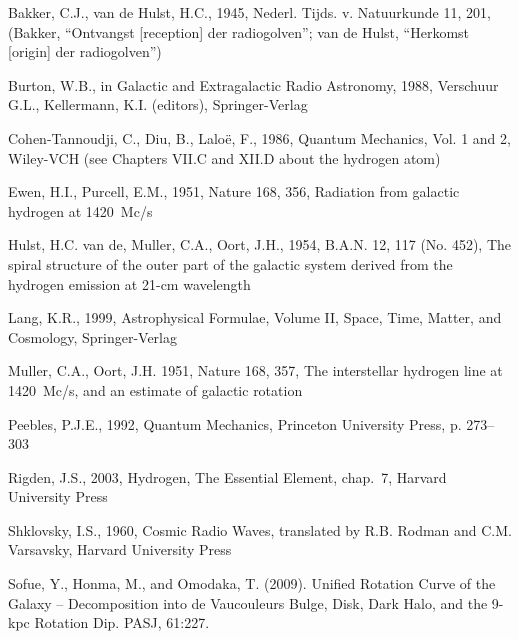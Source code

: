 \begin{thebibliography}{99}

 Bakker, C.J., van de Hulst, H.C., 1945, Nederl. Tijds. v. Natuurkunde
11, 201, (Bakker, ``Ontvangst [reception] der radiogolven'';
van de Hulst, ``Herkomst [origin] der radiogolven'')

 Burton, W.B., in Galactic and Extragalactic Radio Astronomy, 1988,
Verschuur G.L., Kellermann, K.I. (editors), Springer-Verlag

 Cohen-Tannoudji, C., Diu, B., Lalo\"e, F., 1986,
Quantum Mechanics, Vol. 1 and 2, Wiley-VCH (see Chapters VII.C and
XII.D about the hydrogen atom)

 Ewen, H.I., Purcell, E.M., 1951, Nature 168, 356,
Radiation from galactic hydrogen at 1420~Mc/s

 Hulst, H.C. van de, Muller, C.A., Oort, J.H., 1954,
B.A.N. 12, 117 (No. 452),
The spiral structure of the outer part of the galactic system
derived from the hydrogen emission at 21-cm wavelength

 Lang, K.R., 1999, Astrophysical Formulae, Volume II, Space,
Time, Matter, and Cosmology, Springer-Verlag

 Muller, C.A., Oort, J.H. 1951, Nature 168, 357,
The interstellar hydrogen line at 1420~Mc/s, and an
estimate of galactic rotation

 Peebles, P.J.E., 1992, Quantum Mechanics, Princeton University Press,
p. 273--303

 Rigden, J.S., 2003, Hydrogen, The Essential Element, chap.~7,
Harvard University Press

 Shklovsky, I.S., 1960, Cosmic Radio Waves, translated by
R.B. Rodman and C.M. Varsavsky, Harvard University Press

 {Sofue}, Y., {Honma}, M., and {Omodaka},
  T. (2009).  {Unified Rotation Curve of the Galaxy -- Decomposition
    into de Vaucouleurs Bulge, Disk, Dark Halo, and the 9-kpc Rotation
    Dip}.  {PASJ}, 61:227.



\end{thebibliography}

